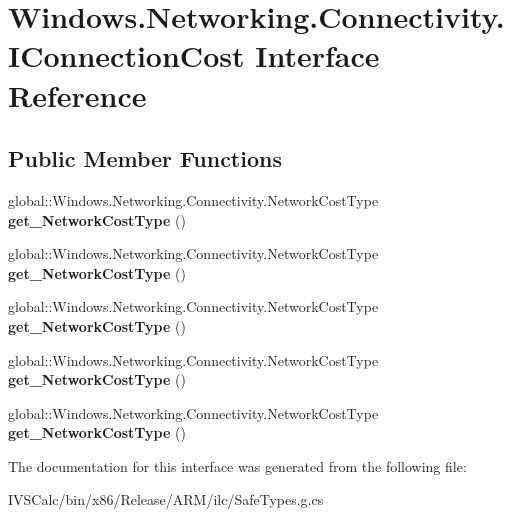 \hypertarget{interface_windows_1_1_networking_1_1_connectivity_1_1_i_connection_cost}{}\section{Windows.\+Networking.\+Connectivity.\+I\+Connection\+Cost Interface Reference}
\label{interface_windows_1_1_networking_1_1_connectivity_1_1_i_connection_cost}
\subsection*{Public Member Functions}
\begin{DoxyCompactItemize}
\item 
\mbox{\label{interface_windows_1_1_networking_1_1_connectivity_1_1_i_connection_cost_a4505d91230e48b6b13bf6c02c4ef2ff6}} 
global\+::\+Windows.\+Networking.\+Connectivity.\+Network\+Cost\+Type {\bfseries get\+\_\+\+Network\+Cost\+Type} ()
\item 
\mbox{\label{interface_windows_1_1_networking_1_1_connectivity_1_1_i_connection_cost_a4505d91230e48b6b13bf6c02c4ef2ff6}} 
global\+::\+Windows.\+Networking.\+Connectivity.\+Network\+Cost\+Type {\bfseries get\+\_\+\+Network\+Cost\+Type} ()
\item 
\mbox{\label{interface_windows_1_1_networking_1_1_connectivity_1_1_i_connection_cost_a4505d91230e48b6b13bf6c02c4ef2ff6}} 
global\+::\+Windows.\+Networking.\+Connectivity.\+Network\+Cost\+Type {\bfseries get\+\_\+\+Network\+Cost\+Type} ()
\item 
\mbox{\label{interface_windows_1_1_networking_1_1_connectivity_1_1_i_connection_cost_a4505d91230e48b6b13bf6c02c4ef2ff6}} 
global\+::\+Windows.\+Networking.\+Connectivity.\+Network\+Cost\+Type {\bfseries get\+\_\+\+Network\+Cost\+Type} ()
\item 
\mbox{\label{interface_windows_1_1_networking_1_1_connectivity_1_1_i_connection_cost_a4505d91230e48b6b13bf6c02c4ef2ff6}} 
global\+::\+Windows.\+Networking.\+Connectivity.\+Network\+Cost\+Type {\bfseries get\+\_\+\+Network\+Cost\+Type} ()
\end{DoxyCompactItemize}


The documentation for this interface was generated from the following file\+:\begin{DoxyCompactItemize}
\item 
I\+V\+S\+Calc/bin/x86/\+Release/\+A\+R\+M/ilc/Safe\+Types.\+g.\+cs\end{DoxyCompactItemize}
